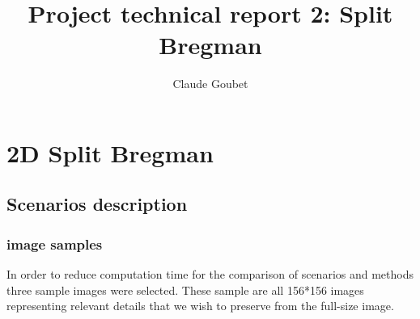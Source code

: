 \documentclass[10pt,a4paper,titlepage]{article}
\author{Claude Goubet}
\title{Project technical report 2: Split Bregman}
\begin{document}
\maketitle

\section{2D Split Bregman}
	
	\subsection{Scenarios description}
		\subsubsection{image samples}
		In order to reduce computation time for the comparison of scenarios and methods three sample images were selected. These sample are all 156*156 images representing relevant details that we wish to preserve from the full-size image.
\end{document}
